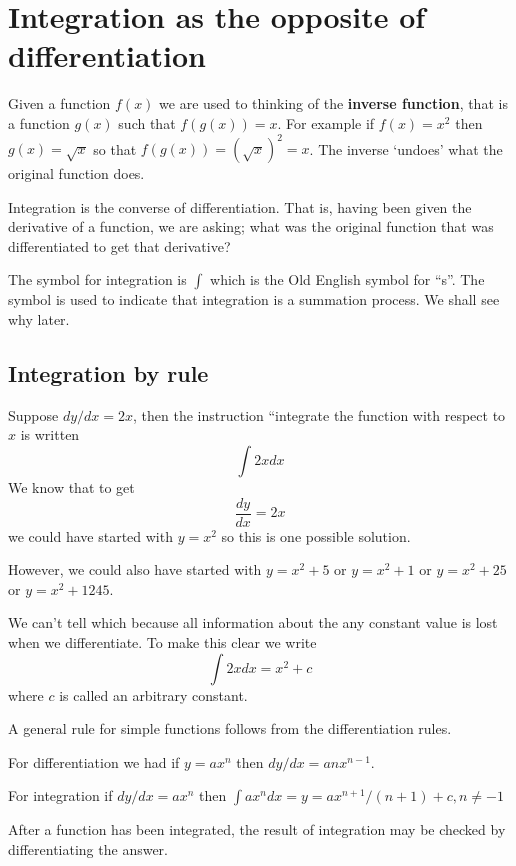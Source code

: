 \documentclass[
  11pt,
  oneside]{book}
\newcommand{\slide}{}
\theoremstyle{definition}
\theoremstyle{definition}
\theoremstyle{definition}
\theoremstyle{definition}
\theoremstyle{remark}
\begin{document}
\slide

\section{Integration as the opposite of differentiation}\label{integration-as-the-opposite-of-differentiation}

Given a function \(f(x)\) we are used to thinking of the \textbf{inverse function}, that is a function \(g(x)\) such that \(f(g(x)) = x\). For example if \(f(x) = x^2\) then \(g(x) = \sqrt{x}\) so that \(f(g(x)) = (\sqrt{x})^2 = x\). The inverse `undoes' what the original function does.

Integration is the converse of differentiation. That is, having been given the derivative of a function, we are asking; what was the original function that was differentiated to get that derivative?

The symbol for integration is \(\displaystyle\int\) which is the Old English symbol for ``s''. The symbol is used to indicate that integration is a summation process. We shall see why later.

\slide

\subsection{Integration by rule}\label{integration-by-rule}

Suppose \(dy/dx = 2x\), then the instruction ``integrate the function with respect to \(x\) is written
\[
\int 2x dx
\]
We know that to get
\[
\frac{dy}{dx} = 2x
\]
we could have started with \(y = x^2\) so this is one possible solution.

However, we could also have started with \(y = x^2 + 5\) or \(y = x^2 + 1\) or \(y = x^2 + 25\) or \(y = x^2 + 1245\).

We can't tell which because all information about the any constant value is lost when we differentiate. To make this clear we write
\[
\int 2x dx = x^2 + c
\]
where \(c\) is called an arbitrary constant.

\slide

A general rule for simple functions follows from the differentiation rules.

For differentiation we had if \(y = ax^n\) then \(dy/dx= anx^{n-1}\).

For integration if \(dy/dx = ax^n\) then \(\displaystyle\int ax^n dx = y = ax^{n+1}/(n+1) + c, n \ne -1\)

After a function has been integrated, the result of integration may be checked by differentiating the answer.
\end{document}
